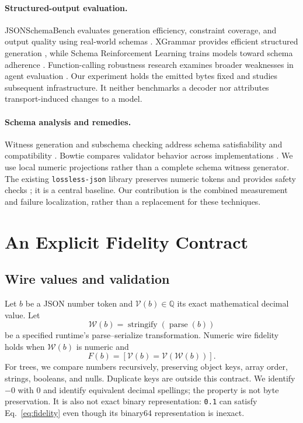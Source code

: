 \documentclass[11pt]{article}
\newcommand{\wire}{\mathcal{W}}
\newcommand{\val}{\mathcal{V}}
\begin{document}
\paragraph{Structured-output evaluation.}
JSONSchemaBench evaluates generation efficiency, constraint coverage, and output quality using real-world schemas \citep{geng2025}. XGrammar provides efficient structured generation \citep{dong2025}, while Schema Reinforcement Learning trains models toward schema adherence \citep{lu-etal-2025-learning}. Function-calling robustness research examines broader weaknesses in agent evaluation \citep{rabinovich2025}. Our experiment holds the emitted bytes fixed and studies subsequent infrastructure. It neither benchmarks a decoder nor attributes transport-induced changes to a model.

\paragraph{Schema analysis and remedies.}
Witness generation and subschema checking address schema satisfiability and compatibility \citep{attouche2022,habib2021}. Bowtie compares validator behavior across implementations \citep{berman2023}. We use local numeric projections rather than a complete schema witness generator. The existing \texttt{lossless-json} library preserves numeric tokens and provides safety checks \citep{deJong2026}; it is a central baseline. Our contribution is the combined measurement and failure localization, rather than a replacement for these techniques.

\section{An Explicit Fidelity Contract}
\subsection{Wire values and validation}
Let $b$ be a JSON number token and $\val(b)\in\mathbb{Q}$ its exact mathematical decimal value. Let
\begin{equation}
 \wire(b)=\operatorname{stringify}(\operatorname{parse}(b))
\end{equation}
be a specified runtime's parse--serialize transformation. Numeric wire fidelity holds when $\wire(b)$ is numeric and
\begin{equation}\label{eq:fidelity}
 F(b) = [\val(b)=\val(\wire(b))].
\end{equation}
For trees, we compare numbers recursively, preserving object keys, array order, strings, booleans, and nulls. Duplicate keys are outside this contract. We identify $-0$ with $0$ and identify equivalent decimal spellings; the property is not byte preservation. It is also not exact binary representation: \texttt{0.1} can satisfy Eq.~\ref{eq:fidelity} even though its binary64 representation is inexact.
\end{document}
